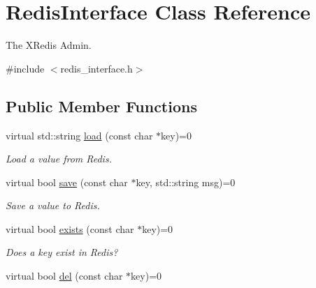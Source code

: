 \hypertarget{classRedisInterface}{\section{Redis\-Interface Class Reference}
\label{classRedisInterface}
}


The X\-Redis Admin.  




{\ttfamily \#include $<$redis\-\_\-interface.\-h$>$}

\subsection*{Public Member Functions}
\begin{DoxyCompactItemize}
\item 
\hypertarget{classRedisInterface_afd325866fd98ca6e002b2702e5566ee5}{virtual std\-::string \hyperlink{classRedisInterface_afd325866fd98ca6e002b2702e5566ee5}{load} (const char $\ast$key)=0}\label{classRedisInterface_afd325866fd98ca6e002b2702e5566ee5}

\begin{DoxyCompactList}\small\item\em Load a value from Redis. \end{DoxyCompactList}\item 
\hypertarget{classRedisInterface_adb0d6e3f8a0848cbb6b346e57aeb3ad5}{virtual bool \hyperlink{classRedisInterface_adb0d6e3f8a0848cbb6b346e57aeb3ad5}{save} (const char $\ast$key, std\-::string msg)=0}\label{classRedisInterface_adb0d6e3f8a0848cbb6b346e57aeb3ad5}

\begin{DoxyCompactList}\small\item\em Save a value to Redis. \end{DoxyCompactList}\item 
\hypertarget{classRedisInterface_a3881f54b919852b7aaa231015775544e}{virtual bool \hyperlink{classRedisInterface_a3881f54b919852b7aaa231015775544e}{exists} (const char $\ast$key)=0}\label{classRedisInterface_a3881f54b919852b7aaa231015775544e}

\begin{DoxyCompactList}\small\item\em Does a key exist in Redis? \end{DoxyCompactList}\item 
\hypertarget{classRedisInterface_abb9b1fe2c11911648d62d431968fa04e}{virtual bool \hyperlink{classRedisInterface_abb9b1fe2c11911648d62d431968fa04e}{del} (const char $\ast$key)=0}\label{classRedisInterface_abb9b1fe2c11911648d62d431968fa04e}


\end{DoxyCompactItemize}
